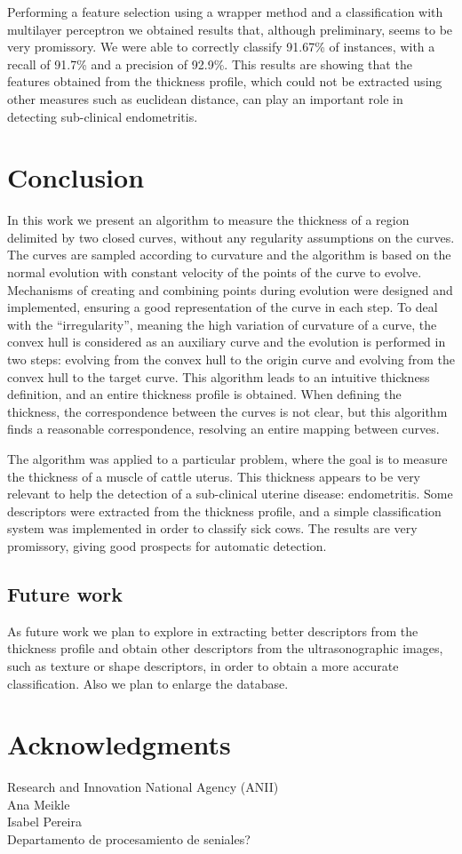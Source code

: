 \documentclass{article}
\begin{document}
Performing a feature selection using a wrapper method and a classification with multilayer perceptron we obtained results that, although preliminary, seems to be very promissory. We were able to correctly classify 91.67\% of instances, with a recall of 91.7\% and a precision of 92.9\%. This results are showing that the features obtained from the thickness profile, which could not be extracted using other measures such as euclidean distance, can play an important role in detecting sub-clinical endometritis.

\section{Conclusion}
\label{sec:conc}
In this work we present an algorithm to measure the thickness of a region delimited by two closed curves, without any regularity assumptions on the curves. The curves are sampled according to curvature and the algorithm is based on the normal evolution with constant velocity of the points of the curve to evolve. Mechanisms of creating and combining points during evolution were designed and implemented, ensuring a good representation of the curve in each step. To deal with the ``irregularity'', meaning the high variation of curvature of a curve, the convex hull is considered as an auxiliary curve and the evolution is performed in two steps: evolving from the convex hull to the origin curve and evolving from the convex hull to the target curve. This algorithm leads to an intuitive thickness definition, and an entire thickness profile is obtained. When defining the thickness, the correspondence between the curves is not clear, but this algorithm finds a reasonable correspondence, resolving an entire mapping between curves.

The algorithm was applied to a particular problem, where the goal is to measure the thickness of a muscle of cattle uterus. This thickness appears to be very relevant to help the detection of a sub-clinical uterine disease: endometritis. Some descriptors were extracted from the thickness profile, and a simple classification system was implemented in order to classify sick cows. The results are very promissory, giving good prospects for automatic detection.

\subsection{Future work}
\label{ssec:future}
As future work we plan to explore in extracting better descriptors from the thickness profile and obtain other descriptors from the ultrasonographic images, such as texture or shape descriptors, in order to obtain a more accurate classification. Also we plan to enlarge the database.

\section{Acknowledgments}
Research and Innovation National Agency (ANII)\\
Ana Meikle\\
Isabel Pereira\\
Departamento de procesamiento de seniales?




\balance
\end{document}

